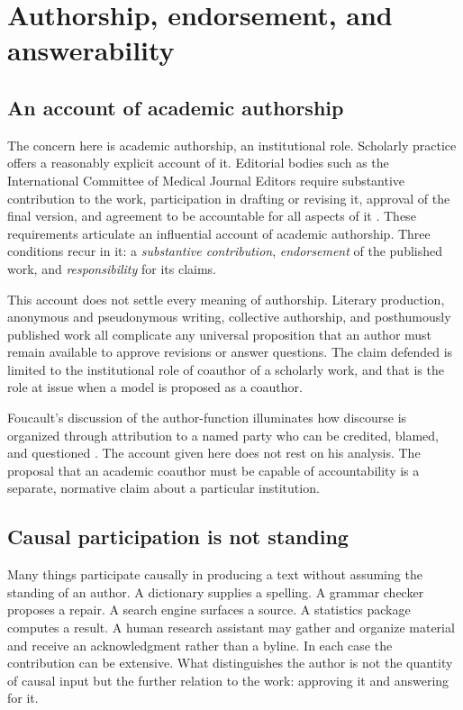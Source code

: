 \documentclass[11pt]{article}
\begin{document}
\section{Authorship, endorsement, and answerability}

\subsection{An account of academic authorship}

The concern here is academic authorship, an institutional role. Scholarly practice offers a reasonably explicit account of it. Editorial bodies such as the International Committee of Medical Journal Editors require substantive contribution to the work, participation in drafting or revising it, approval of the final version, and agreement to be accountable for all aspects of it \cite{icmje}. These requirements articulate an influential account of academic authorship. Three conditions recur in it: a \emph{substantive contribution}, \emph{endorsement} of the published work, and \emph{responsibility} for its claims.

This account does not settle every meaning of authorship. Literary production, anonymous and pseudonymous writing, collective authorship, and posthumously published work all complicate any universal proposition that an author must remain available to approve revisions or answer questions. The claim defended is limited to the institutional role of coauthor of a scholarly work, and that is the role at issue when a model is proposed as a coauthor.

Foucault's discussion of the author-function illuminates how discourse is organized through attribution to a named party who can be credited, blamed, and questioned \cite{foucault1977}. The account given here does not rest on his analysis. The proposal that an academic coauthor must be capable of accountability is a separate, normative claim about a particular institution.

\subsection{Causal participation is not standing}

Many things participate causally in producing a text without assuming the standing of an author. A dictionary supplies a spelling. A grammar checker proposes a repair. A search engine surfaces a source. A statistics package computes a result. A human research assistant may gather and organize material and receive an acknowledgment rather than a byline. In each case the contribution can be extensive. What distinguishes the author is not the quantity of causal input but the further relation to the work: approving it and answering for it.
\end{document}
